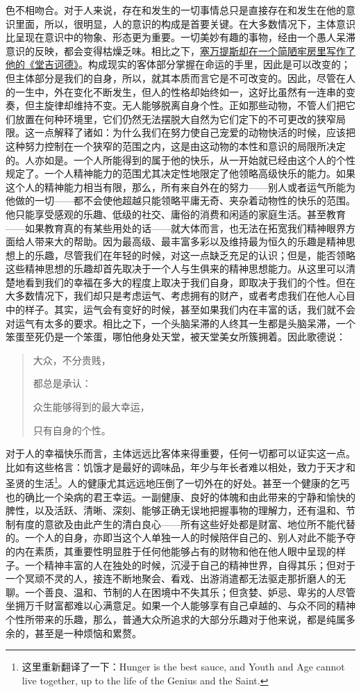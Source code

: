 \documentclass[12pt,oneside]{book}
\begin{document}
色不相吻合。对于人来说，存在和发生的一切事情总只是直接存在和发生在他的意识里面，所以，很明显，人的意识的构成是首要关键。在大多数情况下，主体意识比呈现在意识中的物象、形态更为重要。一切美妙有趣的事物，经由一个愚人呆滞意识的反映，都会变得枯燥乏味。相比之下，\uline{塞万提斯却在一个简陋牢房里写作了他的《堂吉诃德》}。构成现实的客体部分掌握在命运的手里，因此是可以改变的；但主体部分是我们的自身，所以，就其本质而言它是不可改变的。因此，尽管在人的一生中，外在变化不断发生，但人的性格却始终如一，这好比虽然有一连串的变奏，但主旋律却维持不变。无人能够脱离自身个性。正如那些动物，不管人们把它们放置在何种环境里，它们仍然无法摆脱大自然为它们定下的不可更改的狭窄局限。这一点解释了诸如：为什么我们在努力使自己宠爱的动物快活的时候，应该把这种努力控制在一个狭窄的范围之内，这是由这动物的本性和意识的局限所决定的。人亦如是。一个人所能得到的属于他的快乐，从一开始就已经由这个人的个性规定了。一个人精神能力的范围尤其决定性地限定了他领略高级快乐的能力。如果这个人的精神能力相当有限，那么，所有来自外在的努力——别人或者运气所能为他做的一切——都不会使他超越只能领略平庸无奇、夹杂着动物性的快乐的范围。他只能享受感观的乐趣、低级的社交、庸俗的消费和闲适的家庭生活。甚至教育——如果教育真的有某些用处的话——就大体而言，也无法在拓宽我们精神眼界方面给人带来大的帮助。因为最高级、最丰富多彩以及维持最为恒久的乐趣是精神思想上的乐趣，尽管我们在年轻的时候，对这一点缺乏充足的认识；但是，能否领略这些精神思想的乐趣却首先取决于一个人与生俱来的精神思想能力。从这里可以清楚地看到我们的幸福在多大的程度上取决于我们自身，即取决于我们的个性。但在大多数情况下，我们却只是考虑运气、考虑拥有的财产，或者考虑我们在他人心目中的样子。其实，运气会有变好的时候，甚至如果我们内在丰富的话，我们就不会对运气有太多的要求。相比之下，一个头脑呆滞的人终其一生都是头脑呆滞，一个笨蛋至死仍是一个笨蛋，哪怕他身处天堂，被天堂美女所簇拥着。因此歌德说： 


\begin{quotation}
大众，不分贵贱， 

都总是承认： 

众生能够得到的最大幸运， 

只有自身的个性。 
\end{quotation}


 
对于人的幸福快乐而言，主体远远比客体来得重要，任何一切都可以证实这一点。比如有这些格言：饥饿才是最好的调味品，年少与年长者难以相处，致力于天才和圣贤的生活\footnote{ 这里重新翻译了一下：Hunger is the best sauce, and Youth and Age cannot live together, up to the life of the Genius and the Saint.}。人的健康尤其远远地压倒了一切外在的好处。甚至一个健康的乞丐也的确比一个染病的君王幸运。一副健康、良好的体魄和由此带来的宁静和愉快的脾性，以及活跃、清晰、深刻、能够正确无误地把握事物的理解力，还有温和、节制有度的意欲及由此产生的清白良心——所有这些好处都是财富、地位所不能代替的。一个人的自身，亦即当这个人单独一人的时候陪伴自己的、别人对此不能予夺的内在素质，其重要性明显胜于任何他能够占有的财物和他在他人眼中呈现的样子。一个精神丰富的人在独处的时候，沉浸于自己的精神世界，自得其乐；但对于一个冥顽不灵的人，接连不断地聚会、看戏、出游消遣都无法驱走那折磨人的无聊。一个善良、温和、节制的人在困境中不失其乐；但贪婪、妒忌、卑劣的人尽管坐拥万千财富都难以心满意足。如果一个人能够享有自己卓越的、与众不同的精神个性所带来的乐趣，那么，普通大众所追求的大部分乐趣对于他来说，都是纯属多余的，甚至是一种烦恼和累赘。 
\end{document}

